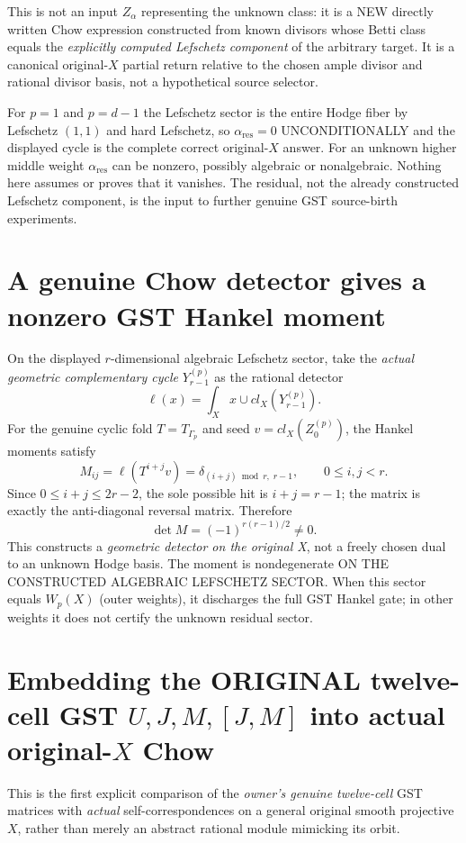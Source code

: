 \documentclass[11pt]{article}
\begin{document}
This is not an input $Z_\alpha$ representing the unknown class:
it is a NEW directly written Chow expression constructed from
known divisors whose Betti class equals the \emph{explicitly computed
Lefschetz component} of the arbitrary target.
It is a canonical original-$X$ partial return relative to the
chosen ample divisor and rational divisor basis, not a hypothetical
source selector.

For $p=1$ and $p=d-1$ the Lefschetz sector is the entire Hodge
fiber by Lefschetz $(1,1)$ and hard Lefschetz, so
$\alpha_{\mathrm{res}}=0$ UNCONDITIONALLY and the displayed cycle
is the complete correct original-$X$ answer.
For an unknown higher middle weight $\alpha_{\mathrm{res}}$
can be nonzero, possibly algebraic or nonalgebraic.
Nothing here assumes or proves that it vanishes.
The residual, not the already constructed Lefschetz component,
is the input to further genuine GST source-birth experiments.

\section{A genuine Chow detector gives a nonzero GST Hankel moment}
On the displayed $r$-dimensional algebraic Lefschetz sector,
take the \emph{actual geometric complementary cycle}
$Y_{r-1}^{(p)}$ as the rational detector
\[
\ell(x)=\int_X x\cup cl_X(Y_{r-1}^{(p)}).
\]
For the genuine cyclic fold $T=T_{\Gamma_p}$ and seed
$v=cl_X(Z_0^{(p)})$, the Hankel moments satisfy
\[
M_{ij}=\ell(T^{i+j}v)
=\delta_{(i+j)\bmod r,\;r-1},
\qquad 0\le i,j<r.
\]
Since $0\le i+j\le2r-2$, the sole possible hit is
$i+j=r-1$; the matrix is exactly the
anti-diagonal reversal matrix. Therefore
\[
\boxed{\det M=(-1)^{r(r-1)/2}\ne0.}
\]
This constructs a \emph{geometric detector on the original X},
not a freely chosen dual to an unknown Hodge basis.
The moment is nondegenerate ON THE CONSTRUCTED ALGEBRAIC
LEFSCHETZ SECTOR. When this sector equals $W_p(X)$
(outer weights), it discharges the full GST Hankel gate;
in other weights it does not certify the unknown residual sector.


\section{Embedding the ORIGINAL twelve-cell GST $U,J,M,[J,M]$ into actual original-$X$ Chow}

This is the first explicit comparison of the \emph{owner's genuine
twelve-cell} GST matrices with \emph{actual} self-correspondences
on a general original smooth projective $X$, rather than merely
an abstract rational module mimicking its orbit.
\end{document}
